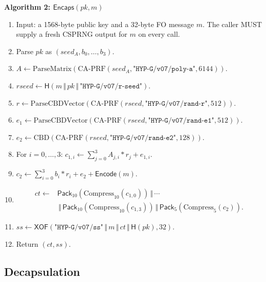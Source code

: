 \documentclass[runningheads]{llncs}
\newcommand{\concat}{\,\Vert\,}
\newcommand{\Hash}{\mathsf{H}}
\newcommand{\XOF}{\mathsf{XOF}}
\newcommand{\Encaps}{\mathsf{Encaps}}
\newcommand{\Encode}{\mathsf{Encode}}
\newcommand{\Pack}{\mathsf{Pack}}
\newcommand{\CBD}{\mathrm{CBD}}
\newcommand{\Compress}{\mathrm{Compress}}
\newenvironment{steps}[1]
  {\par\medskip\noindent\textbf{#1}\par\nopagebreak\small
   \begin{enumerate}[label=\arabic*:,leftmargin=*]}
  {\end{enumerate}\par\medskip}
\begin{document}
\begin{steps}{Algorithm 2: $\Encaps(pk,m)$}
\item Input: a 1568-byte public key and a 32-byte FO message $m$.
  The caller MUST supply a fresh CSPRNG output for $m$ on every call.
\item Parse $pk$ as $(\mathit{seed}_A,b_0,\ldots,b_3)$.
\item $A\gets\mathrm{ParseMatrix}(
  \mathrm{CA\text{-}PRF}(\mathit{seed}_A,
  \texttt{"HYP-G/v07/poly-a"},6144))$.
\item $\mathit{rseed}\gets\Hash(m\concat pk\concat
  \texttt{"HYP-G/v07/r-seed"})$.
\item $r\gets\mathrm{ParseCBDVector}(
  \mathrm{CA\text{-}PRF}(\mathit{rseed},
  \texttt{"HYP-G/v07/rand-r"},512))$.
\item $e_1\gets\mathrm{ParseCBDVector}(
  \mathrm{CA\text{-}PRF}(\mathit{rseed},
  \texttt{"HYP-G/v07/rand-e1"},512))$.
\item $e_2\gets\CBD(\mathrm{CA\text{-}PRF}(\mathit{rseed},
  \texttt{"HYP-G/v07/rand-e2"},128))$.
\item For $i=0,\ldots,3$:
  $c_{1,i}\gets\sum_{j=0}^{3}A_{j,i}*r_j+e_{1,i}$.
\item $c_2\gets\sum_{i=0}^{3}b_i*r_i+e_2+\Encode(m)$.
\item
\[
\begin{aligned}
 ct\gets{}&\Pack_{10}(\Compress_{10}(c_{1,0}))\concat\cdots\\
 &\concat\Pack_{10}(\Compress_{10}(c_{1,3}))
 \concat\Pack_5(\Compress_5(c_2)).
\end{aligned}
\]
\item $ss\gets\XOF(\texttt{"HYP-G/v07/ss"}\concat m\concat ct
  \concat\Hash(pk),32)$.
\item Return $(ct,ss)$.
\end{steps}

\subsection{Decapsulation}
\end{document}
